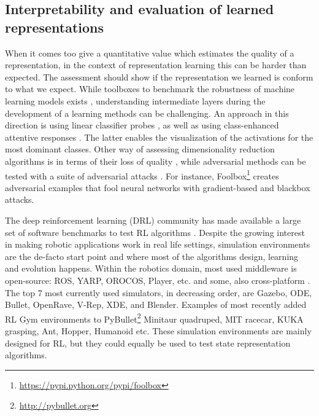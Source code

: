 \documentclass[a4paper]{article}
\begin{document}
\subsection{Interpretability  and evaluation of learned representations}
When it comes too give a quantitative value which estimates the quality of a representation, in the context of representation learning this can be harder than expected. The assessment should show if the representation we learned is conform to what we expect. While toolboxes to benchmark the robustness of machine learning models exists \cite{Rauber17}, understanding intermediate layers during the development of a learning methods can be challenging. An approach in this direction is using linear classifier probes \cite{Alain16}, as well as using class-enhanced attentive responses \cite{Kumar17}. The latter enables the visualization of the activations for the most dominant classes.  Other way of assessing dimensionality reduction algorithms is in terms of their loss of quality \cite{Gracia14}, while adversarial methods can be tested with a suite of adversarial attacks \cite{Rauber17}. For instance, Foolbox\footnote{\url{https://pypi.python.org/pypi/foolbox}} creates adversarial examples that fool neural networks with gradient-based and blackbox attacks. %


The deep reinforcement learning (DRL) community has made available a large set of software benchmarks to test RL algorithms \cite{Arulkumaran17}. 
Despite the growing interest in making robotic applications work in real life settings, simulation environments are the de-facto start point and where most of the algorithms design, learning and evolution happens. 
Within the robotics domain, most used middleware is open-source: ROS, YARP, OROCOS, Player, etc. and some, also cross-platform \cite{Ivaldi14}. The top 7 most currently used simulators, in decreasing order, are Gazebo, ODE, Bullet, OpenRave, V-Rep, XDE, and Blender. Examples of most recently added RL Gym environments to PyBullet\footnote{\url{http://pybullet.org}} Minitaur quadruped, MIT racecar, KUKA grasping, Ant, Hopper, Humanoid etc. 
These simulation environments are mainly designed for RL, but they could equally be used to test state representation algorithms.
\end{document}
